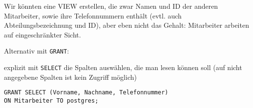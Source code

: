 \documentclass{bschlangaul-aufgabe}
\begin{document}
\begin{enumerate}
\begin{bAntwort}
Wir könnten eine VIEW erstellen, die zwar Namen und ID der anderen
Mitarbeiter, sowie ihre Telefonnummern enthält (evtl. auch
Abteilungsbezeichnung und ID), aber eben nicht das Gehalt: Mitarbeiter
arbeiten auf eingeschränkter Sicht.

Alternativ mit \verb|GRANT|:

explizit mit \verb|SELECT| die Spalten auswählen,
die man lesen können soll (auf nicht angegebene Spalten ist kein Zugriff
möglich)

\begin{verbatim}
GRANT SELECT (Vorname, Nachname, Telefonnummer)
ON Mitarbeiter TO postgres;
\end{verbatim}
\end{bAntwort}
\end{enumerate}
\end{document}
